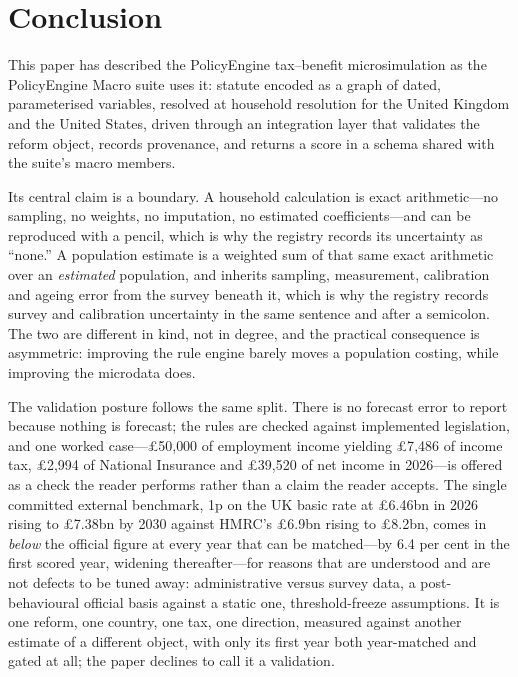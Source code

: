 \section{Conclusion}
\label{sec:conclusion}

This paper has described the PolicyEngine tax--benefit microsimulation as the PolicyEngine Macro suite uses it: statute encoded as a graph of dated, parameterised variables, resolved at household resolution for the United Kingdom and the United States, driven through an integration layer that validates the reform object, records provenance, and returns a score in a schema shared with the suite's macro members.

Its central claim is a boundary. A household calculation is exact arithmetic---no sampling, no weights, no imputation, no estimated coefficients---and can be reproduced with a pencil, which is why the registry records its uncertainty as ``none.'' A population estimate is a weighted sum of that same exact arithmetic over an \emph{estimated} population, and inherits sampling, measurement, calibration and ageing error from the survey beneath it, which is why the registry records survey and calibration uncertainty in the same sentence and after a semicolon. The two are different in kind, not in degree, and the practical consequence is asymmetric: improving the rule engine barely moves a population costing, while improving the microdata does.

The validation posture follows the same split. There is no forecast error to report because nothing is forecast; the rules are checked against implemented legislation, and one worked case---\pounds 50{,}000 of employment income yielding \pounds 7{,}486 of income tax, \pounds 2{,}994 of National Insurance and \pounds 39{,}520 of net income in 2026---is offered as a check the reader performs rather than a claim the reader accepts. The single committed external benchmark, 1p on the UK basic rate at \pounds 6.46bn in 2026 rising to \pounds 7.38bn by 2030 against HMRC's \pounds 6.9bn rising to \pounds 8.2bn, comes in \emph{below} the official figure at every year that can be matched---by 6.4 per cent in the first scored year, widening thereafter---for reasons that are understood and are not defects to be tuned away: administrative versus survey data, a post-behavioural official basis against a static one, threshold-freeze assumptions. It is one reform, one country, one tax, one direction, measured against another estimate of a different object, with only its first year both year-matched and gated at all; the paper declines to call it a validation.

